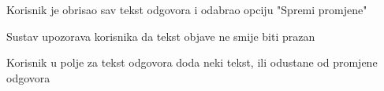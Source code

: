 \begin{packed_item}
\begin{packed_item}
\begin{packed_enum}
							\end{packed_enum}
						\item[4.b] Korisnik je obrisao sav tekst odgovora i odabrao opciju "Spremi promjene"
							\item[] \begin{packed_enum}
								
								\item Sustav upozorava korisnika da tekst objave ne smije biti prazan
								\item Korisnik u polje za tekst odgovora doda neki tekst, ili odustane od promjene odgovora
								
							\end{packed_enum}
						\end{packed_item}
						
					\end{packed_item}	
					
